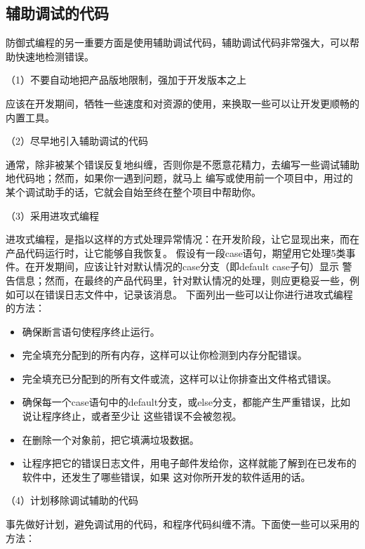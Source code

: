 \documentclass{article}
\begin{document}
\subsection{辅助调试的代码}
防御式编程的另一重要方面是使用辅助调试代码，辅助调试代码非常强大，可以帮助快速地检测错误。
\par
（1）不要自动地把产品版地限制，强加于开发版本之上
\par
应该在开发期间，牺牲一些速度和对资源的使用，来换取一些可以让开发更顺畅的内置工具。
\par
（2）尽早地引入辅助调试的代码
\par
通常，除非被某个错误反复地纠缠，否则你是不愿意花精力，去编写一些调试辅助地代码地；然而，如果你一遇到问题，就马上
编写或使用前一个项目中，用过的某个调试助手的话，它就会自始至终在整个项目中帮助你。
\par
（3）采用进攻式编程
\par
进攻式编程，是指以这样的方式处理异常情况：在开发阶段，让它显现出来，而在产品代码运行时，让它能够自我恢复。
假设有一段case语句，期望用它处理5类事件。在开发期间，应该让针对默认情况的case分支（即default case子句）显示
警告信息；然而，在最终的产品代码里，针对默认情况的处理，则应更稳妥一些，例如可以在错误日志文件中，记录该消息。
下面列出一些可以让你进行进攻式编程的方法：
\begin{itemize}
    \item 确保断言语句使程序终止运行。
    \item 完全填充分配到的所有内存，这样可以让你检测到内存分配错误。
    \item 完全填充已分配到的所有文件或流，这样可以让你排查出文件格式错误。
    \item 确保每一个case语句中的default分支，或else分支，都能产生严重错误，比如说让程序终止，或者至少让
    这些错误不会被忽视。
    \item 在删除一个对象前，把它填满垃圾数据。
    \item 让程序把它的错误日志文件，用电子邮件发给你，这样就能了解到在已发布的软件中，还发生了哪些错误，如果
    这对你所开发的软件适用的话。
\end{itemize}
\par
（4）计划移除调试辅助的代码
\par
事先做好计划，避免调试用的代码，和程序代码纠缠不清。下面使一些可以采用的方法：
\end{document}
